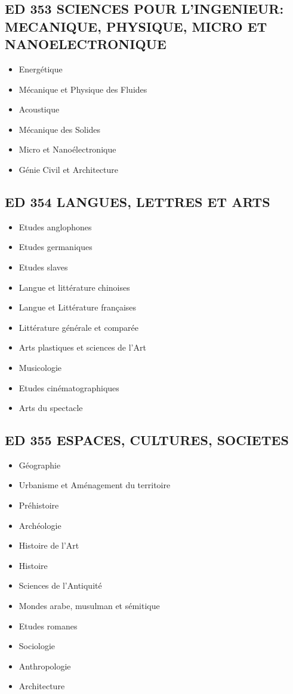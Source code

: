 	\subsection*{ED 353 SCIENCES POUR L'INGENIEUR: MECANIQUE, PHYSIQUE, MICRO ET NANOELECTRONIQUE}\label{ed-353-sciences-pour-lingenieur-mecanique-physique-micro-et-nanoelectronique}

		\begin{itemize}
		\item Energétique
		\item Mécanique et Physique des Fluides
		\item Acoustique
		\item Mécanique des Solides
		\item Micro et Nanoélectronique
		\item Génie Civil et Architecture
		\end{itemize}

	\subsection*{ED 354 LANGUES, LETTRES ET ARTS}\label{ed-354-langues-lettres-et-arts}

		\begin{itemize}
		\item Etudes anglophones
		\item Etudes germaniques
		\item Etudes slaves
		\item Langue et littérature chinoises
		\item Langue et Littérature françaises
		\item Littérature générale et comparée
		\item Arts plastiques et sciences de l'Art
		\item Musicologie
		\item Etudes cinématographiques
		\item Arts du spectacle
		\end{itemize}

	\subsection*{ED 355 ESPACES, CULTURES, SOCIETES}\label{ed-355-espaces-cultures-societes}

		\begin{itemize}
		\item Géographie
		\item Urbanisme et Aménagement du territoire
		\item Préhistoire
		\item Archéologie
		\item Histoire de l'Art
		\item Histoire
		\item Sciences de l'Antiquité
		\item Mondes arabe, musulman et sémitique
		\item Etudes romanes
		\item Sociologie
		\item Anthropologie
		\item Architecture
		\end{itemize}

